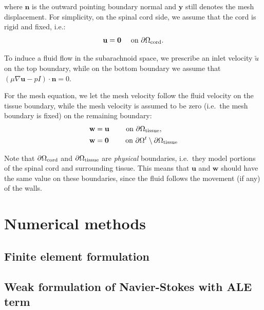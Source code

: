 \documentclass[11pt,a4paper,titlepage]{report}
\begin{document}
where $\mathbf{n}$ is the outward pointing boundary normal and
$\mathbf{y}$ still denotes the mesh displacement. For simplicity, on
the spinal cord side, we assume that the cord is rigid and fixed,
i.e.:
\begin{equation}
  \mathbf{u} = \mathbf{0} \quad \text { on } \partial \Omega_{\rm cord}.
\end{equation}

To induce a fluid flow in the subarachnoid space, we prescribe an
inlet velocity $\tilde{u}$ on the top boundary, while on the bottom
boundary we assume that $ \left ( \mu \nabla \mathbf{u} - p I \right )
\cdot \mathbf{n} = 0$.

For the mesh equation, we let the mesh velocity follow the fluid
velocity on the tissue boundary, while the mesh velocity is assumed to
be zero (i.e.~the mesh boundary is fixed) on the remaining boundary:
\begin{align}
\mathbf{w} &= \mathbf{u}  \qquad \text{ on } \partial \Omega_{\rm tissue},\\
\mathbf{w} &= \mathbf{0}  \qquad \text{ on } \partial \Omega^t \setminus \partial \Omega_{\rm tissue}
\end{align}

Note that $\partial \Omega_{\rm cord}$ and $\partial \Omega_{\rm
  tissue}$ are \textit{physical} boundaries, i.e.~they model portions
of the spinal cord and surrounding tissue. This means that
$\mathbf{u}$ and $\mathbf{w}$ should have the same value on these
boundaries, since the fluid follows the movement (if any) of the
walls.


\chapter{Numerical methods}

\section{Finite element formulation}

\section{Weak formulation of Navier-Stokes with ALE term}

\end{document}

